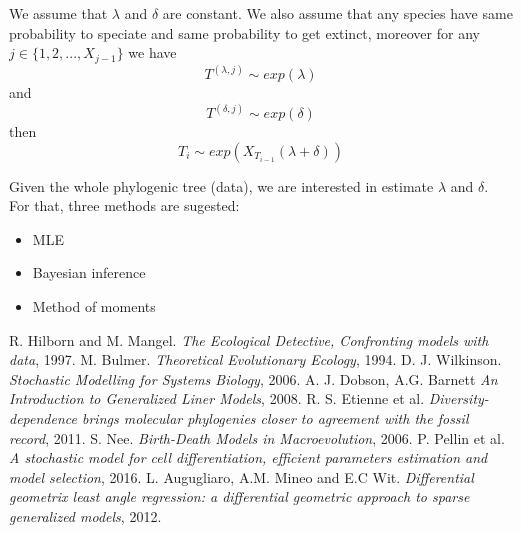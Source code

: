 \documentclass[a4paper,9pt]{extarticle}
\begin{document}
 We assume that $\lambda$ and $\delta$ are constant. We also assume that any species have same probability to speciate 
 and same probability to get extinct, moreover for any $j \in \{1,2,...,X_{j-1}\}$ we have $$T^{(\lambda,j)} \sim exp(\lambda)$$ and $$T^{(\delta,j)} \sim exp(\delta)$$ then $$T_i \sim exp(X_{T_{i-1}}(\lambda+\delta))$$
  




Given the whole phylogenic tree (data), we are interested in estimate $\lambda$ and $\delta$. For that, three methods are sugested: 

\begin{itemize}
 \item MLE
 \item Bayesian inference
 \item Method of moments
\end{itemize}




  
 
\begin{thebibliography}{widest entry}
 R. Hilborn and M. Mangel. \emph{The Ecological Detective, Confronting models with data}, 1997.
 M. Bulmer. \emph{Theoretical Evolutionary Ecology}, 1994.
D. J. Wilkinson. \emph{Stochastic Modelling for Systems Biology}, 2006.
 A. J. Dobson, A.G. Barnett \emph{An Introduction to Generalized Liner Models}, 2008.
 R. S. Etienne et al. \emph{Diversity-dependence brings molecular phylogenies closer to agreement with the fossil record}, 2011.
 S. Nee. \emph{Birth-Death Models in Macroevolution}, 2006.
 P. Pellin et al. \emph{A stochastic model for cell differentiation, efficient parameters estimation and model selection}, 2016.
 L. Augugliaro, A.M. Mineo and E.C Wit. \emph{Differential geometrix least angle regression: a differential geometric approach to sparse generalized models}, 2012.

\end{thebibliography}
\end{document}
